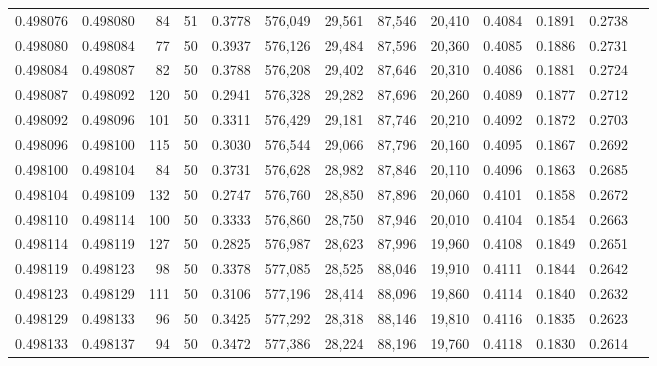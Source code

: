 \begin{tabular}{rrrrrrrrrrrrr}
0.498076 & 0.498080 &    84 &  51 &                                     0.3778 & 576,049 &  29,561 &  87,546 &  20,410 & 0.4084 & 0.1891 & 0.2738 \\
0.498080 & 0.498084 &    77 &  50 &                                     0.3937 & 576,126 &  29,484 &  87,596 &  20,360 & 0.4085 & 0.1886 & 0.2731 \\
0.498084 & 0.498087 &    82 &  50 &                                     0.3788 & 576,208 &  29,402 &  87,646 &  20,310 & 0.4086 & 0.1881 & 0.2724 \\
0.498087 & 0.498092 &   120 &  50 &                                     0.2941 & 576,328 &  29,282 &  87,696 &  20,260 & 0.4089 & 0.1877 & 0.2712 \\
0.498092 & 0.498096 &   101 &  50 &                                     0.3311 & 576,429 &  29,181 &  87,746 &  20,210 & 0.4092 & 0.1872 & 0.2703 \\
0.498096 & 0.498100 &   115 &  50 &                                     0.3030 & 576,544 &  29,066 &  87,796 &  20,160 & 0.4095 & 0.1867 & 0.2692 \\
0.498100 & 0.498104 &    84 &  50 &                                     0.3731 & 576,628 &  28,982 &  87,846 &  20,110 & 0.4096 & 0.1863 & 0.2685 \\
0.498104 & 0.498109 &   132 &  50 &                                     0.2747 & 576,760 &  28,850 &  87,896 &  20,060 & 0.4101 & 0.1858 & 0.2672 \\
0.498110 & 0.498114 &   100 &  50 &                                     0.3333 & 576,860 &  28,750 &  87,946 &  20,010 & 0.4104 & 0.1854 & 0.2663 \\
0.498114 & 0.498119 &   127 &  50 &                                     0.2825 & 576,987 &  28,623 &  87,996 &  19,960 & 0.4108 & 0.1849 & 0.2651 \\
0.498119 & 0.498123 &    98 &  50 &                                     0.3378 & 577,085 &  28,525 &  88,046 &  19,910 & 0.4111 & 0.1844 & 0.2642 \\
0.498123 & 0.498129 &   111 &  50 &                                     0.3106 & 577,196 &  28,414 &  88,096 &  19,860 & 0.4114 & 0.1840 & 0.2632 \\
0.498129 & 0.498133 &    96 &  50 &                                     0.3425 & 577,292 &  28,318 &  88,146 &  19,810 & 0.4116 & 0.1835 & 0.2623 \\
0.498133 & 0.498137 &    94 &  50 &                                     0.3472 & 577,386 &  28,224 &  88,196 &  19,760 & 0.4118 & 0.1830 & 0.2614 \\

\end{tabular}
